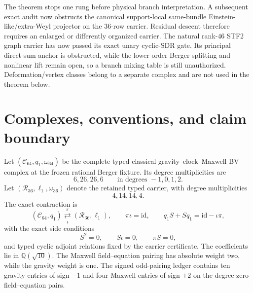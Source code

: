 \documentclass[11pt]{article}
\theoremstyle{definition}
\theoremstyle{remark}
\newcommand{\Q}{\mathbb Q}
\newcommand{\cC}{\mathcal C}
\newcommand{\cR}{\mathcal R}
\newcommand{\id}{\mathrm{id}}
\begin{document}
The theorem stops one rung before physical branch interpretation.  A
subsequent exact audit now obstructs the canonical support-local same-bundle
Einstein-like/extra-Weyl projector on the $36$-row carrier.  Residual descent
therefore requires an enlarged or differently organized carrier.  The
natural rank-$46$ STF2 graph carrier has now passed its exact unary cyclic-SDR
gate.  Its principal direct-sum anchor is obstructed, while the lower-order
Berger splitting and nonlinear lift remain open, so a branch mixing table is
still unauthorized.  Deformation/vertex classes belong to a separate complex
and are not used in the theorem below.

\section{Complexes, conventions, and claim boundary}\label{sec:setup}

Let $(\cC_{64},q_1,\omega_{64})$ be the complete typed classical
gravity--clock--Maxwell BV complex at the frozen rational Berger fixture.
Its degree multiplicities are
\begin{equation}
 6,26,26,6\qquad\text{in degrees }-1,0,1,2.
\end{equation}
Let $(\cR_{36},\ell_1,\omega_{36})$ denote the retained typed carrier, with
degree multiplicities
\begin{equation}
 4,14,14,4.
\end{equation}
The exact contraction is
\begin{equation}\label{eq:sdr}
 \left(\cC_{64},q_1\right)
 \underset{\iota}{\overset{\pi}{\rightleftarrows}}
 \left(\cR_{36},\ell_1\right),
 \qquad
 \pi\iota=\id,
 \qquad
 q_1S+Sq_1=\id-\iota\pi,
\end{equation}
with the exact side conditions
\begin{equation}\label{eq:side-conditions}
 S^2=0,\qquad S\iota=0,\qquad \pi S=0,
\end{equation}
and typed cyclic adjoint relations fixed by the carrier certificate.  The
coefficients lie in $\Q(\sqrt{10})$.  The Maxwell
field--equation pairing has absolute weight two, while the gravity weight is
one.  The signed odd-pairing ledger contains ten gravity entries of sign
$-1$ and four Maxwell entries of sign $+2$ on the degree-zero
field--equation pairs.
\end{document}
